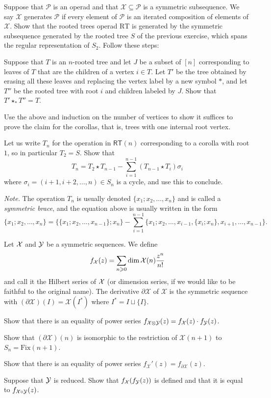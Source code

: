 \begin{question}
Suppose that $\mathcal P$ is an operad
and that $\mathcal X\subseteq \mathcal P$
is a symmetric subsequence. We say
$\mathcal X$ generates $\mathcal P$
if every element of $\mathcal P$ is
an iterated composition of elements of
$\mathcal X$. 
Show that the rooted trees operad 
$\mathrm{RT}$ 
is generated by the symmetric subsequence
generated by the rooted tree $S$ of the
previous exercise, which spans
the regular representation of
$S_2$. Follow these steps:
\end{question}
\begin{tenumerate}
\item Suppose that $T$ is an $n$-rooted tree
and let $J$ be a subset of $[n]$ corresponding
to leaves of $T$ that are the children of a
vertex $i\in T$. Let $T'$ be the
tree obtained by erasing all these leaves
and replacing the vertex label by a new
symbol $\ast$, and let $T''$ be the rooted
tree with root $i$ and children labeled
by $J$. Show that $T'\star_\ast T'' = T$.
\item Use the above and induction on the
number of vertices to show it suffices to prove
the claim for the corollas, that is, trees with
one internal root vertex.
\item Let us write $T_n$
for the operation in $\mathsf{RT}(n)$
corresponding to a corolla with root $1$,
so in particular $T_2 = S$.
Show that 
\[ 
T_n = 
 T_2\star T_{n-1} - 
  	\sum_{i=1}^{n-1} (T_{n-1}\star T_i)\sigma_i
\]
where $\sigma_i = (i+1,i+2,\ldots,n)\in S_n$
is a cycle, and use this to conclude.
\end{tenumerate}

\emph{Note.} The operation $T_n$ is usually
denoted $\{x_1; x_2,\ldots,x_n\}$ and is called
a \emph{symmetric brace}, and the equation
above is usually written in the form
\[ 
\{x_1; x_2,\ldots,x_n\} = 
 \{\{x_1; x_2,\ldots,x_{n-1}\}; x_n\}
 - \sum_{i=1}^{n-1} \{ x_1; x_2,
 \ldots, x_{i-1}, \{x_i ; x_n \},
 x_{i+1},\ldots,x_{n-1}\}.
 \]
 
 \begin{question}\label{ex:operations-on-species}
 Let $\mathcal{X}$ and $\mathcal{Y}$ be a symmetric sequences.
 We define \[f_{\mathcal{X}}(z) = \sum_{n\geqslant 0} \dim \mathcal{X}(n) \frac{z^n}{n!}\]
 and call it the Hilbert series of $\mathcal{X}$
 (or dimension series, if we would like to be
 faithful to the original name). The derivative $\partial\mathcal X$ 
 of $\mathcal X$ is the symmetric sequence
 with $(\partial\mathcal X)(I) = \mathcal X(I^*)$
 where $I^* = I \sqcup \{ I \}$.
 \begin{tenumerate}
 \item Show that there is an equality of power series $f_{\mathcal{X}\otimes \mathcal{Y}}(z) = f_{\mathcal{X}}(z)\cdot f_{\mathcal{Y}}(z)$.
 \item Show that $(\partial \mathcal X)(n)$ 
 is isomorphic to the restriction of $\mathcal{X}(n+1)$ to $S_n = \mathrm{Fix}(n+1)$.
 \item  Show  that there is an equality of power series $f_{\mathcal X}'(z) = 
  			f_{\partial\mathcal X}(z)$.
  \item Suppose that $\mathcal{Y}$ is reduced. Show that $f_{\mathcal{X}}(f_{\mathcal{Y}}(z))$ is defined and that it is equal to 
  $f_{\mathcal{X}\circ \mathcal{Y}}(z)$.
  \end{tenumerate}
 \end{question}
